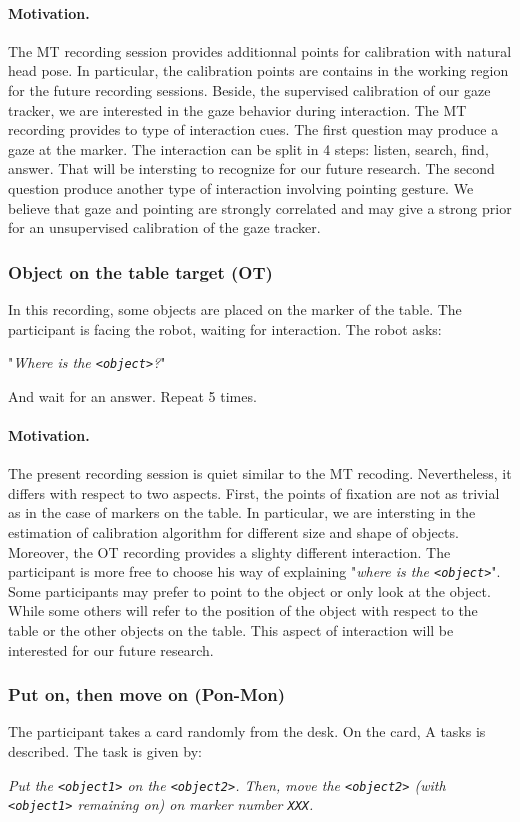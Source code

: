 \documentclass[11pt,a4paper]{article}
\begin{document}
\paragraph{Motivation.}
The MT recording session provides additionnal points for calibration with natural head pose. In particular, the calibration points are contains in the working region for the future recording sessions. Beside, the supervised calibration of our gaze tracker, we are interested in the gaze behavior during interaction. The MT recording provides to type of interaction cues. The first question may produce a gaze at the marker. The interaction can be split in 4 steps: listen, search, find, answer. That will be intersting to recognize for our future research. The second question produce another type of interaction involving pointing gesture. We believe that gaze and pointing  are strongly correlated and may give a strong prior for an unsupervised calibration of the gaze tracker.
 
\subsubsection{Object on the table target (OT)}
In this recording, some objects are placed on the marker of the table. The participant is facing the robot, waiting for interaction. The robot asks: 
\begin{center}
"\textit{Where is the \texttt{<object>}?}"
\end{center}
And wait for an answer. Repeat 5 times.
\paragraph{Motivation.} The present recording session is quiet similar to the MT recoding. Nevertheless, it differs with respect to two aspects. First, the points of fixation are not as trivial as in the case of markers on the table. In particular, we are intersting in the estimation of calibration algorithm for different size and shape of objects. Moreover, the OT recording provides a slighty different interaction. The participant is more free to choose his way of explaining "\textit{where is the \texttt{<object>}}". Some participants may prefer to point to the object or only look at the object. While some others will refer to the position of the object with respect to the table or the other objects on the table. This aspect of interaction will be interested for our future research. 


\subsubsection{Put on, then move on (Pon-Mon)}
The participant takes a card randomly from the desk. On the card, A tasks is described. The task is given by:
\begin{center}
\textit{Put the \texttt{<object1>} on the \texttt{<object2>}. Then, move the \texttt{<object2>} (with \texttt{<object1>} remaining on) on marker number \texttt{XXX}.}
\end{center}
\end{document}
